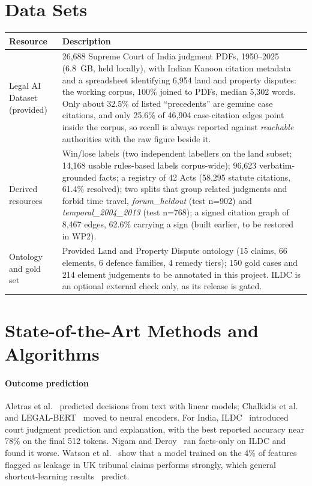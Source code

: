 \documentclass[12pt,a4paper]{article}
\newcommand{\hdr}{\rowcolor{band}}
\begin{document}
\section{Data Sets}
\begin{tabularx}{\textwidth}{@{}P{3.1cm}Y@{}}
\toprule
\hdr \textbf{Resource} & \textbf{Description} \\
\midrule
Legal AI Dataset (provided) &
26,688 Supreme Court of India judgment PDFs, 1950--2025 (6.8~GB, held locally), with Indian Kanoon
citation metadata and a spreadsheet identifying 6,954 land and property disputes: the working corpus,
100\% joined to PDFs, median 5,302 words. Only about 32.5\% of listed ``precedents'' are genuine case
citations, and only 25.6\% of 46,904 case-citation edges point inside the corpus, so recall is always
reported against \emph{reachable} authorities with the raw figure beside it. \\
\addlinespace
Derived resources &
Win/lose labels (two independent labellers on the land subset; 14,168 usable rules-based labels
corpus-wide); 96,623 verbatim-grounded facts; a registry of 42 Acts (58,295 statute citations, 61.4\%
resolved); two splits that group related judgments and forbid time travel, \emph{forum\_heldout} (test
n=902) and \emph{temporal\_2004\_2013} (test n=768); a signed citation graph of 8,467 edges, 62.6\%
carrying a sign (built earlier, to be restored in WP2). \\
\addlinespace
Ontology and gold set &
Provided Land and Property Dispute ontology (15 claims, 66 elements, 6 defence families, 4 remedy tiers); 150 gold cases and 214 element judgements to be annotated in this project. ILDC \cite{ildc} is an optional external check only, as its release is gated. \\
\bottomrule
\end{tabularx}

\section{State-of-the-Art Methods and Algorithms}
\paragraph{Outcome prediction} Aletras et al.~\cite{aletras} predicted decisions from text with linear models;
Chalkidis et al.~\cite{chalkidis19} and LEGAL-BERT~\cite{legalbert} moved to neural encoders. For India, ILDC~\cite{ildc} introduced court judgment prediction and explanation, with the
best reported accuracy near 78\% on the final 512 tokens. Nigam and Deroy~\cite{nigam} ran facts-only
on ILDC and found it worse. Watson et al.~\cite{watson} show that a model trained on the 4\% of
features flagged as leakage in UK tribunal claims performs strongly, which general shortcut-learning
results~\cite{geirhos} predict.
\end{document}
